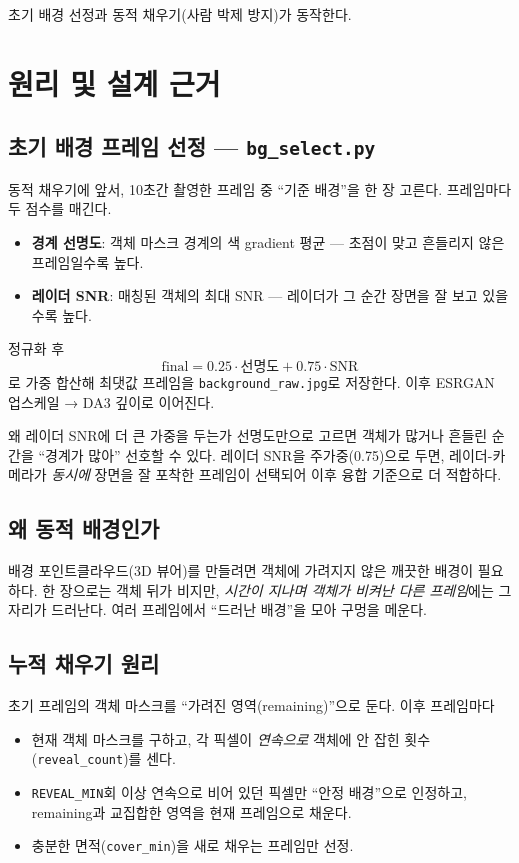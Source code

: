 \begin{statusdone}
초기 배경 선정과 동적 채우기(사람 박제 방지)가 동작한다.
\end{statusdone}

\chapter{원리 및 설계 근거}

\section{초기 배경 프레임 선정 — \texttt{bg\_select.py}}
동적 채우기에 앞서, 10초간 촬영한 프레임 중 ``기준 배경''을 한 장 고른다.
프레임마다 두 점수를 매긴다.
\begin{itemize}
  \item \textbf{경계 선명도}: 객체 마스크 경계의 색 gradient 평균 — 초점이 맞고
        흔들리지 않은 프레임일수록 높다.
  \item \textbf{레이더 SNR}: 매칭된 객체의 최대 SNR — 레이더가 그 순간 장면을
        잘 보고 있을수록 높다.
\end{itemize}
정규화 후 \[ \text{final} = 0.25\cdot\text{선명도} + 0.75\cdot\text{SNR} \]
로 가중 합산해 최댓값 프레임을 \texttt{background\_raw.jpg}로 저장한다. 이후
ESRGAN 업스케일 → DA3 깊이로 이어진다.

\begin{designbox}{왜 레이더 SNR에 더 큰 가중을 두는가}
선명도만으로 고르면 객체가 많거나 흔들린 순간을 ``경계가 많아'' 선호할 수 있다.
레이더 SNR을 주가중(0.75)으로 두면, 레이더-카메라가 \emph{동시에} 장면을 잘
포착한 프레임이 선택되어 이후 융합 기준으로 더 적합하다.
\end{designbox}

\section{왜 동적 배경인가}
배경 포인트클라우드(3D 뷰어)를 만들려면 객체에 가려지지 않은 깨끗한 배경이
필요하다. 한 장으로는 객체 뒤가 비지만, \emph{시간이 지나며 객체가 비켜난 다른
프레임}에는 그 자리가 드러난다. 여러 프레임에서 ``드러난 배경''을 모아 구멍을
메운다.

\section{누적 채우기 원리}
초기 프레임의 객체 마스크를 ``가려진 영역(remaining)''으로 둔다. 이후 프레임마다
\begin{itemize}
  \item 현재 객체 마스크를 구하고, 각 픽셀이 \emph{연속으로} 객체에 안 잡힌
        횟수(\texttt{reveal\_count})를 센다.
  \item \texttt{REVEAL\_MIN}회 이상 연속으로 비어 있던 픽셀만 ``안정 배경''으로
        인정하고, remaining과 교집합한 영역을 현재 프레임으로 채운다.
  \item 충분한 면적(\texttt{cover\_min})을 새로 채우는 프레임만 선정.
\end{itemize}

